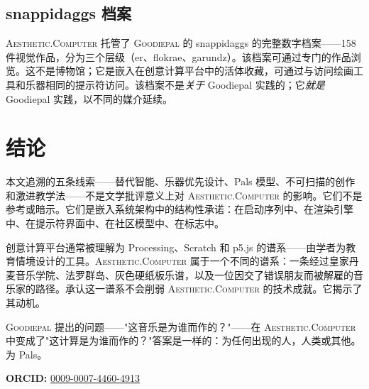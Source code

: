 \documentclass[10pt,letterpaper,twocolumn]{article}
\newcommand{\ac}{\textsc{Aesthetic.Computer}}
\newcommand{\gp}{\textsc{Goodiepal}}
\begin{document}
\subsection{snappidaggs 档案}

\ac{} 托管了 \gp{} 的 snappidaggs 的完整数字档案——158件视觉作品，分为三个层级（er、flokrae、garundz）。该档案可通过专门的作品浏览。这不是博物馆；它是嵌入在创意计算平台中的活体收藏，可通过与访问绘画工具和乐器相同的提示符访问。该档案不是\emph{关于} Goodiepal 实践的；它\emph{就是} Goodiepal 实践，以不同的媒介延续。

\section{结论}

本文追溯的五条线索——替代智能、乐器优先设计、Pals 模型、不可扫描的创作和激进教学法——不是文学批评意义上对 \ac{} 的影响。它们不是参考或暗示。它们是嵌入系统架构中的结构性承诺：在启动序列中、在渲染引擎中、在提示符界面中、在社区模型中、在标志中。

创意计算平台通常被理解为 Processing、Scratch 和 p5.js 的谱系——由学者为教育情境设计的工具。\ac{} 属于一个不同的谱系：一条经过皇家丹麦音乐学院、法罗群岛、灰色硬纸板乐谱，以及一位因交了错误朋友而被解雇的音乐家的路径。承认这一谱系不会削弱 \ac{} 的技术成就。它揭示了其动机。

\gp{} 提出的问题——"这音乐是为谁而作的？"——在 \ac{} 中变成了"这计算是为谁而作的？"答案是一样的：为任何出现的人，人类或其他。为 Pals。

\vspace{0.5em}
\noindent\textbf{ORCID:} \href{https://orcid.org/0009-0007-4460-4913}{0009-0007-4460-4913}



\end{document}

